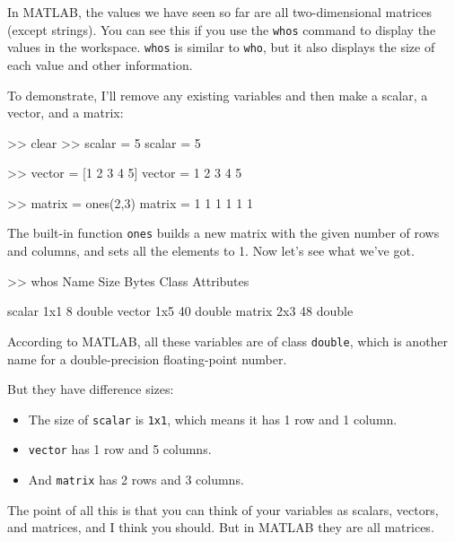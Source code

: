 \documentclass[
]{book}
\numberwithin{Answer}{chapter}
\numberwithin{Exercise}{chapter}
\begin{document}
In MATLAB, the values we have seen so far are all two-dimensional matrices (except strings).
You can see this if you use the {\tt whos} command to display the
values in the workspace.  {\tt whos} is similar to {\tt who}, but it also displays the size of each value and other information.


To demonstrate, I'll remove any existing variables and then 
make a scalar, a vector, and a matrix:

\begin{code}
>> clear
>> scalar = 5
scalar = 5

>> vector = [1 2 3 4 5]
vector = 1     2     3     4     5

>> matrix = ones(2,3)
matrix =
     1     1     1
     1     1     1
\end{code}

The built-in function {\tt ones} builds a new matrix with the given
number of rows and columns, and sets all the elements to 1.
Now let's see what we've got.


\begin{code}
>> whos
  Name        Size            Bytes  Class     Attributes
              
  scalar      1x1                 8  double              
  vector      1x5                40  double              
  matrix      2x3                48  double              
\end{code}

According to MATLAB, all these variables are of class {\tt double}, which
is another name for a double-precision floating-point number.

But they have difference sizes: 

\begin{itemize}

\item The size of {\tt scalar} is {\tt 1x1}, which means it has 1 row and 1 column.  

\item {\tt vector} has 1 row and 5 columns.  

\item And {\tt matrix} has 2 rows and 3 columns.

\end{itemize}

The point of all this is that you can think of your variables as
scalars, vectors, and matrices, and I think you should.  But in MATLAB they are all matrices.
\end{document}
